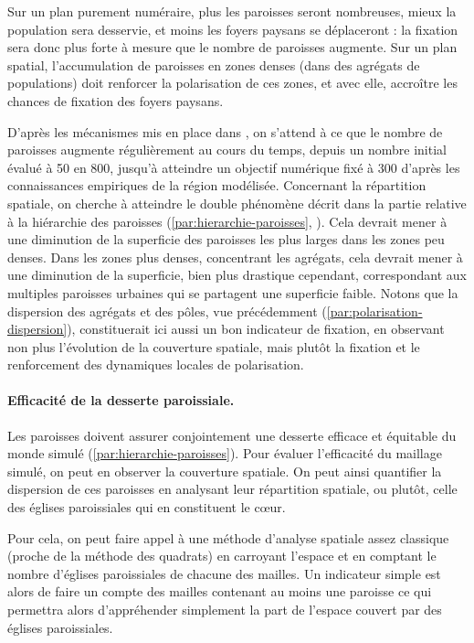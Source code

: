 Sur un plan purement numéraire, plus les paroisses seront nombreuses, mieux la population sera desservie, et moins les foyers paysans se déplaceront : la fixation sera donc plus forte à mesure que le nombre de paroisses augmente.
Sur un plan spatial, l'accumulation de paroisses en zones denses (dans des agrégats de populations) doit renforcer la polarisation de ces zones, et avec elle, accroître les chances de fixation des foyers paysans.

D'après les mécanismes mis en place dans \simfeodal{}, on s'attend à ce que le nombre de paroisses augmente régulièrement au cours du temps, depuis un nombre initial évalué à 50 en 800, jusqu'à atteindre un objectif numérique fixé à 300 d'après les connaissances empiriques de la région modélisée.
Concernant la répartition spatiale, on cherche à atteindre le double phénomène décrit dans la partie relative à la hiérarchie des paroisses (\cref{par:hierarchie-paroisses}, \pageref{par:hierarchie-paroisses}).
Cela devrait mener à une diminution de la superficie des paroisses les plus larges dans les zones peu denses.
Dans les zones plus denses, concentrant les agrégats, cela devrait mener à une diminution de la superficie, bien plus drastique cependant, correspondant aux multiples paroisses \og urbaines\fg{} qui se partagent une superficie faible.
Notons que la dispersion des agrégats et des pôles, vue précédemment (\ref{par:polarisation-dispersion}), constituerait ici aussi un bon indicateur de fixation, en observant non plus l'évolution de la couverture spatiale, mais plutôt la fixation et le renforcement des dynamiques locales de polarisation.

\paragraph{Efficacité de la desserte paroissiale.}

Les paroisses doivent assurer conjointement une desserte efficace et équitable du monde simulé (\cref{par:hierarchie-paroisses}).
Pour évaluer l'efficacité du maillage simulé, on peut en observer la couverture spatiale.
On peut ainsi quantifier la dispersion de ces paroisses en analysant leur répartition spatiale, ou plutôt, celle des églises paroissiales qui en constituent le cœur.

Pour cela, on peut faire appel à une méthode d'analyse spatiale assez classique (proche de la méthode des quadrats) en carroyant l'espace et en comptant le nombre d'églises paroissiales de chacune des mailles.
Un indicateur simple est alors de faire un compte des mailles contenant au moins une paroisse ce qui permettra alors d'appréhender simplement la part de l'espace couvert par des églises paroissiales.

